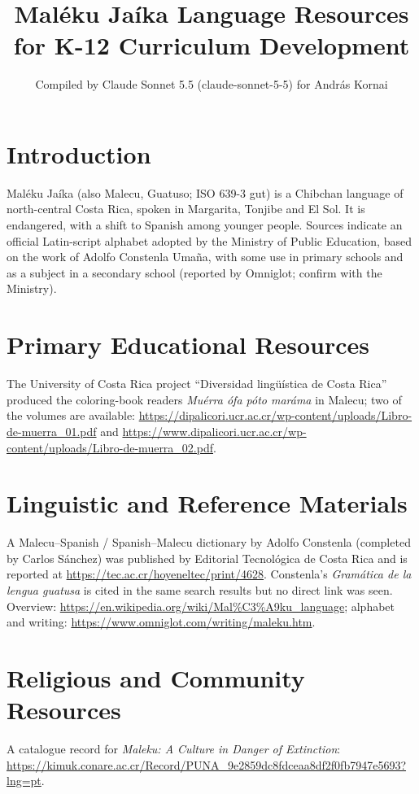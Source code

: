 \documentclass[12pt]{article}
\title{Mal\'eku Ja\'ika Language Resources for K-12 Curriculum Development}
\author{Compiled by Claude Sonnet 5.5 (claude-sonnet-5-5) for Andr\'as Kornai}
\date{}
\begin{document}
\maketitle

\section{Introduction}
Mal\'eku Ja\'ika (also Malecu, Guatuso; ISO 639-3 gut) is a Chibchan language of north-central Costa Rica, spoken in Margarita, Tonjibe and El Sol. It is endangered, with a shift to Spanish among younger people. Sources indicate an official Latin-script alphabet adopted by the Ministry of Public Education, based on the work of Adolfo Constenla Uma\~na, with some use in primary schools and as a subject in a secondary school (reported by Omniglot; confirm with the Ministry).

\section{Primary Educational Resources}
The University of Costa Rica project ``Diversidad ling\"u\'istica de Costa Rica'' produced the coloring-book readers \emph{Mu\'erra \'ofa p\'oto mar\'ama} in Malecu; two of the volumes are available: \url{https://dipalicori.ucr.ac.cr/wp-content/uploads/Libro-de-muerra_01.pdf} and \url{https://www.dipalicori.ucr.ac.cr/wp-content/uploads/Libro-de-muerra_02.pdf}.

\section{Linguistic and Reference Materials}
A Malecu--Spanish / Spanish--Malecu dictionary by Adolfo Constenla (completed by Carlos S\'anchez) was published by Editorial Tecnol\'ogica de Costa Rica and is reported at \url{https://tec.ac.cr/hoyeneltec/print/4628}. Constenla's \emph{Gram\'atica de la lengua guatusa} is cited in the same search results but no direct link was seen. Overview: \url{https://en.wikipedia.org/wiki/Mal\%C3\%A9ku_language}; alphabet and writing: \url{https://www.omniglot.com/writing/maleku.htm}.

\section{Religious and Community Resources}
A catalogue record for \emph{Maleku: A Culture in Danger of Extinction}: \url{https://kimuk.conare.ac.cr/Record/PUNA_9e2859dc8fdceaa8df2f0fb7947e5693?lng=pt}.
\end{document}
